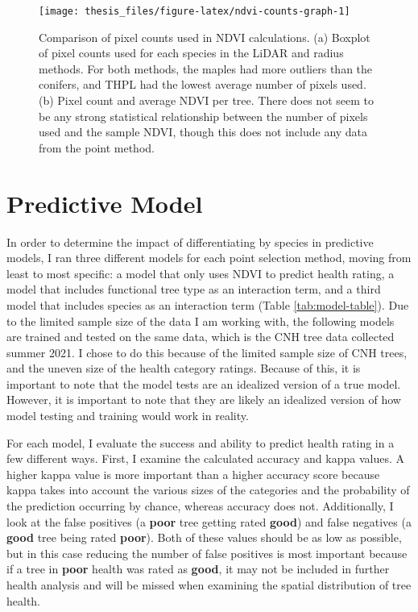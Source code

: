 \documentclass[12pt,twoside]{reedthesis}
\begin{document}
\begin{figure}

{\centering \texttt{[image: thesis\_files/figure-latex/ndvi-counts-graph-1]} 

}

\caption[Pixel counts for NDVI calculation, by method, and for sample NDVI.]{Comparison of pixel counts used in NDVI calculations. (a) Boxplot of pixel counts used for each species in the LiDAR and radius methods. For both methods, the maples had more outliers than the conifers, and THPL had the lowest average number of pixels used. (b) Pixel count and average NDVI per tree. There does not seem to be any strong statistical relationship between the number of pixels used and the sample NDVI, though this does not include any data from the point method.}\label{fig:ndvi-counts-graph}
\end{figure}
\hypertarget{predictive-model}{%
\section{Predictive Model}\label{predictive-model}}

In order to determine the impact of differentiating by species in predictive models, I ran three different models for each point selection method, moving from least to most specific: a model that only uses NDVI to predict health rating, a model that includes functional tree type as an interaction term, and a third model that includes species as an interaction term (Table \ref{tab:model-table}). Due to the limited sample size of the data I am working with, the following models are trained and tested on the same data, which is the CNH tree data collected summer 2021. I chose to do
this because of the limited sample size of CNH trees, and the uneven
size of the health category ratings. Because of this, it is important to
note that the model tests are an idealized version of a true model.
However, it is important to note that they are likely an idealized version of how model testing and training would work in reality.

For each model, I evaluate the success and ability to predict health rating in a few different ways. First, I examine the calculated accuracy and kappa values. A higher kappa value is more important than a higher accuracy score because kappa takes into account the various sizes of the categories and the probability of the prediction occurring by chance, whereas accuracy does not. Additionally, I look at the false positives (a \textbf{poor} tree getting rated \textbf{good}) and false negatives (a \textbf{good} tree being rated \textbf{poor}). Both of these values should be as low as possible, but in this case reducing the number of false positives is most important because if a tree in \textbf{poor} health was rated as \textbf{good}, it may not be included in further health analysis and will be missed when examining the spatial distribution of tree health.
\end{document}
